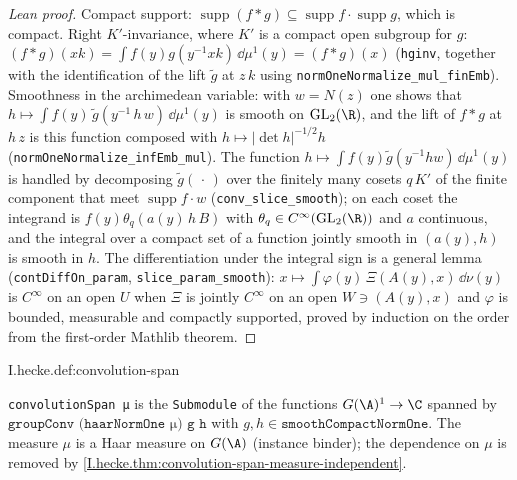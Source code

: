 \begin{proof}[Lean proof]
Compact support: $\operatorname{supp}(f\ast g)\subseteq\operatorname{supp}f\cdot\operatorname{supp}g$, which is compact. Right $K'$-invariance, where $K'$ is a compact open subgroup for $g$: $(f\ast g)(xk)=\int f(y)g(y^{-1}xk)\,\dd\mu^1(y)=(f\ast g)(x)$ (\texttt{hginv}, together with the identification of the lift $\tilde g$ at $z\,k$ using \texttt{normOneNormalize\_mul\_finEmb}). Smoothness in the archimedean variable: with $w=N(z)$ one shows that $h\mapsto\int f(y)\,\tilde g(y^{-1}\,h\,w)\,\dd\mu^1(y)$ is smooth on $\mathrm{GL}_2(\R)$, and the lift of $f\ast g$ at $h\,z$ is this function composed with $h\mapsto|\det h|^{-1/2}h$ (\texttt{normOneNormalize\_infEmb\_mul}). The function $h\mapsto\int f(y)\tilde g(y^{-1}hw)\,\dd\mu^1(y)$ is handled by decomposing $\tilde g(\,\cdot\,)$ over the finitely many cosets $q\,K'$ of the finite component that meet $\operatorname{supp}f\cdot w$ (\texttt{conv\_slice\_smooth}); on each coset the integrand is $f(y)\theta_q(a(y)\,h\,B)$ with $\theta_q\in C^\infty(\mathrm{GL}_2(\R))$ and $a$ continuous, and the integral over a compact set of a function jointly smooth in $(a(y),h)$ is smooth in $h$. The differentiation under the integral sign is a general lemma (\texttt{contDiffOn\_param}, \texttt{slice\_param\_smooth}): $x\mapsto\int\varphi(y)\,\Xi(A(y),x)\,\dd\nu(y)$ is $C^\infty$ on an open $U$ when $\Xi$ is jointly $C^\infty$ on an open $W\ni(A(y),x)$ and $\varphi$ is bounded, measurable and compactly supported, proved by induction on the order from the first-order Mathlib theorem.
\end{proof}

\begin{definition}
\end{definition}
\begin{tfformal}{I.hecke.def:convolution-span}
\begin{tffidelity}
\texttt{convolutionSpan μ} is the \texttt{Submodule} of the functions $G(\A)^1\to\C$ spanned by $\texttt{groupConv (haarNormOne μ) g h}$ with $g,h\in\texttt{smoothCompactNormOne}$. The measure $\mu$ is a Haar measure on $G(\A)$ (instance binder); the dependence on $\mu$ is removed by \cref{I.hecke.thm:convolution-span-measure-independent}.
\end{tffidelity}
\end{tfformal}

